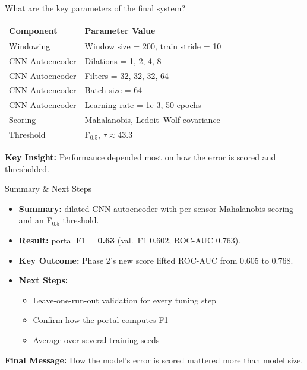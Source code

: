 \documentclass{beamer}
\begin{document}
\begin{frame}{What are the key parameters of the final system?}
\begin{center}
\small
\begin{tabular}{|l|l|}
\hline
\textbf{Component} & \textbf{Parameter Value} \\
\hline
Windowing & Window size = 200, train stride = 10 \\
CNN Autoencoder & Dilations = 1, 2, 4, 8 \\
CNN Autoencoder & Filters = 32, 32, 32, 64 \\
CNN Autoencoder & Batch size = 64 \\
CNN Autoencoder & Learning rate = 1e-3, 50 epochs \\
Scoring & Mahalanobis, Ledoit--Wolf covariance \\
Threshold & F$_{0.5}$, $\tau \approx 43.3$ \\
\hline
\end{tabular}
\end{center}
\textbf{Key Insight:} Performance depended most on how the error is scored and thresholded.
\end{frame}

\begin{frame}{Summary \& Next Steps}
\begin{itemize}
  \item \textbf{Summary:} dilated CNN autoencoder with per-sensor Mahalanobis scoring and an F$_{0.5}$ threshold.
  \item \textbf{Result:} portal F1 = \textbf{0.63} (val.\ F1 0.602, ROC-AUC 0.763).
  \item \textbf{Key Outcome:} Phase 2's new score lifted ROC-AUC from 0.605 to 0.768.
  \item \textbf{Next Steps:}
  \begin{itemize}
    \item Leave-one-run-out validation for every tuning step
    \item Confirm how the portal computes F1
    \item Average over several training seeds
  \end{itemize}
\end{itemize}
\textbf{Final Message:} How the model's error is scored mattered more than model size.
\end{frame}
\end{document}
